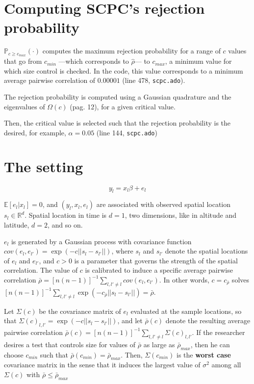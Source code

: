 \documentclass[
]{article}
\begin{document}
\hypertarget{computing-scpcs-rejection-probability}{%
\section{Computing SCPC's rejection
probability}\label{computing-scpcs-rejection-probability}}

\(\mathbb{P}_{c\ge c_{max}}(\cdot)\) computes the maximum rejection
probability for a range of \(c\) values that go from \(c_{min}\)
---which corresponds to \(\hat\rho\)--- to \(c_{max}\), a minimum value
for which size control is checked. In the code, this value corresponds
to a minimum average pairwise correlation of \(0.00001\) (line 478,
\texttt{scpc.ado}).

The rejection probability is computed using a Gaussian quadrature and
the eigenvalues of \(\Omega(c)\) (pag. 12), for a given critical value.

Then, the critical value is selected such that the rejection probability
is the desired, for example, \(\alpha=0.05\) (line 144,
\texttt{scpc.ado})

\hypertarget{the-setting}{%
\section{The setting}\label{the-setting}}

\[
y_l = x_l\beta + e_l
\]

\(\mathbb{E}[e_l|x_l]=0\), and \((y_l, x_l, e_l)\) are associated with
observed spatial location \(s_l \in \mathbb{R}^d\). Spatial location in
time is \(d=1\), two dimensions, like in altitude and latitude, \(d=2\),
and so on.

\(e_l\) is generated by a Gaussian process with covariance function
\(cov(e_l,e_{l'})=\exp(-c||s_l-s_{l'}||)\), where \(s_l\) and \(s_{l'}\)
denote the spatial locations of \(e_l\) and \(e_{l'}\), and \(c>0\) is a
parameter that governs the strength of the spatial correlation. The
value of \(c\) is calibrated to induce a specific average pairwise
correlation
\(\bar{\rho}=[n(n-1)]^{-1}\sum_{l,l'\not=l}cov(e_l,e_{l'})\). In other
words, \(c=c_{\bar{\rho}}\) solves
\([n(n-1)]^{-1}\sum_{l,l'\not=l}\exp(-c_{\bar{\rho}}||s_l-s_{l'}||)=\bar{\rho}\).

Let \(\Sigma(c)\) be the covariance matrix of \(e_l\) evaluated at the
sample locations, so that \(\Sigma(c)_{l,l'}=\exp(-c||s_l-s_{l'} ||)\),
and let \(\bar{\rho}(c)\) denote the resulting average pairwise
correlation
\(\bar{\rho}(c)=[n(n-1)]^{-1}\sum_{l,l'\not=l}\Sigma(c)_{l,l'}\). If the
researcher desires a test that controls size for values of
\(\bar{\rho}\) as large as \(\bar{\rho}_{max}\), then he can choose
\(c_{min}\) such that \(\bar{\rho}(c_{min})=\bar{\rho}_{max}\). Then,
\(\Sigma(c_{min})\) is the \textbf{worst case} covariance matrix in the
sense that it induces the largest value of \(\sigma^2\) among all
\(\Sigma(c)\) with \(\bar{\rho}\le \bar{\rho}_{max}\)
\end{document}
